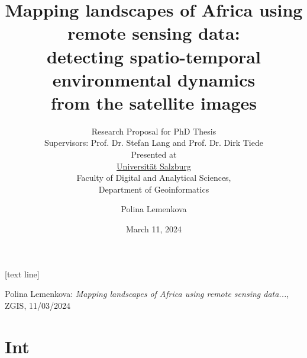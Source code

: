 \documentclass[pdflatex,compress,8pt,
	xcolor={dvipsnames,svgnames,x11names,table},
	hyperref={colorlinks = true,breaklinks = true, urlcolor = NavyBlue}]{beamer}
\title{Mapping landscapes of Africa using remote sensing data: \\detecting spatio-temporal environmental dynamics \\from the satellite images}
\subtitle{Research Proposal for PhD Thesis\\
Supervisors: Prof. Dr. Stefan Lang and Prof. Dr. Dirk Tiede \\\vspace{15pt}
Presented at \\
\href{https://www.plus.ac.at/geoinformatik/}{Universität Salzburg}\\
Faculty of Digital and Analytical Sciences,\\
Department of Geoinformatics}
\author{Polina Lemenkova}
\date{March 11, 2024}
\begin{document}
\maketitle
[text line]{%
\parbox{\linewidth}{\vspace*{-8pt}Polina Lemenkova: \emph{Mapping landscapes of Africa using remote sensing data...}, ZGIS, 11/03/2024} \hfill\insertpagenumber}


\section{Int}
\end{document}
